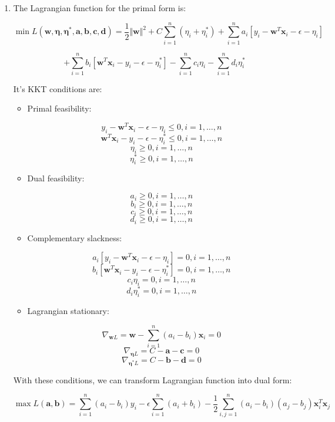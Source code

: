 \documentclass[paper=letter, fontsize=12pt]{article}
\begin{document}
\begin{enumerate}[label=(\alph*)]
	\item
	The Lagrangian function for the primal form is:
	
	$$
	\min L(\mathbf{w}, \mathbf{\eta}, \mathbf{\eta^*}, \mathbf{a}, \mathbf{b}, \mathbf{c}, \mathbf{d}) = \frac{1}{2} \Vert \mathbf{w} \Vert^2 + C \sum_{i = 1}^{n} (\eta_i + \eta_i^*) + \sum_{i = 1}^{n} a_i [y_i - \mathbf{w}^T \mathbf{x}_i - \epsilon - \eta_i]
	$$
	
	$$
	+ \sum_{i = 1}^{n} b_i[\mathbf{w}^T \mathbf{x}_i - y_i - \epsilon - \eta_i^*] - \sum_{i = 1}^{n} c_i \eta_i - \sum_{i = 1}^{n} d_i \eta_i^*
	$$
	
	It's KKT conditions are:
	
	\begin{itemize}
		\item Primal feasibility: 
		
		$$y_i - \mathbf{w}^T \mathbf{x}_i - \epsilon - \eta_i \leq 0, i = 1, \dots, n$$
		$$\mathbf{w}^T \mathbf{x}_i  - y_i - \epsilon - \eta_i^* \leq 0, i = 1, \dots, n$$
		$$\eta_i \geq 0, i = 1, \dots, n$$
		$$\eta_i^* \geq 0, i = 1, \dots, n$$ 
		
		\item Dual feasibility:
		
		$$a_i \geq 0, i = 1, \dots, n$$
		$$b_i \geq 0, i = 1, \dots, n$$
		$$c_i \geq 0, i = 1, \dots, n$$
		$$d_i \geq 0, i = 1, \dots, n$$
		
		\item Complementary slackness:
		
		$$a_i [y_i - \mathbf{w}^T \mathbf{x}_i - \epsilon - \eta_i] = 0,  i = 1, \dots, n$$
		$$b_i [\mathbf{w}^T \mathbf{x}_i  - y_i - \epsilon - \eta_i^*] = 0,  i = 1, \dots, n$$
		$$c_i \eta_i = 0,  i = 1, \dots, n$$
		$$d_i \eta_i^* = 0,  i = 1, \dots, n$$
		
		\item Lagrangian stationary:
		
		$$\nabla_{\mathbf{w} L} = \mathbf{w} - \sum_{i = 1}^{n} (a_i - b_i) \mathbf{x}_i = 0$$
		$$\nabla_{\mathbf{\eta} L} = C - \mathbf{a} - \mathbf{c} = 0$$
		$$\nabla_{\mathbf{\eta^*} L} = C - \mathbf{b} - \mathbf{d} = 0$$

	\end{itemize} 

	With these conditions, we can transform Lagrangian function into dual form:
	
	$$
	\max L(\mathbf{a}, \mathbf{b}) = \sum_{i = 1}^{n} (a_i - b_i) y_i - \epsilon \sum_{i = 1}^{n} (a_i + b_i) - \frac{1}{2} \sum_{i, j = 1}^{n} (a_i - b_i) (a_j - b_j) \mathbf{x}_i^T \mathbf{x}_j
	$$
	

\end{enumerate}
\end{document}
